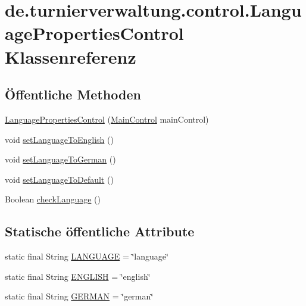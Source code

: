 \hypertarget{classde_1_1turnierverwaltung_1_1control_1_1_language_properties_control}{}\section{de.\+turnierverwaltung.\+control.\+Language\+Properties\+Control Klassenreferenz}
\label{classde_1_1turnierverwaltung_1_1control_1_1_language_properties_control}
\subsection*{Öffentliche Methoden}
\begin{DoxyCompactItemize}
\item 
\hyperlink{classde_1_1turnierverwaltung_1_1control_1_1_language_properties_control_aa565746db91955aac5f76104179d3911}{Language\+Properties\+Control} (\hyperlink{classde_1_1turnierverwaltung_1_1control_1_1_main_control}{Main\+Control} main\+Control)
\item 
void \hyperlink{classde_1_1turnierverwaltung_1_1control_1_1_language_properties_control_a4822b3baef6f0880a496dabd53739182}{set\+Language\+To\+English} ()
\item 
void \hyperlink{classde_1_1turnierverwaltung_1_1control_1_1_language_properties_control_a204477af72a3945c255193041f551e74}{set\+Language\+To\+German} ()
\item 
void \hyperlink{classde_1_1turnierverwaltung_1_1control_1_1_language_properties_control_a9df1cda619d27d4908cce0aed688a7a7}{set\+Language\+To\+Default} ()
\item 
Boolean \hyperlink{classde_1_1turnierverwaltung_1_1control_1_1_language_properties_control_abf3e7a82182d7088324ff935af8b9ada}{check\+Language} ()
\end{DoxyCompactItemize}
\subsection*{Statische öffentliche Attribute}
\begin{DoxyCompactItemize}
\item 
static final String \hyperlink{classde_1_1turnierverwaltung_1_1control_1_1_language_properties_control_a4997322c4c8e0433731c949f0bf45001}{L\+A\+N\+G\+U\+A\+GE} = \char`\"{}language\char`\"{}
\item 
static final String \hyperlink{classde_1_1turnierverwaltung_1_1control_1_1_language_properties_control_ab9e9e73447fb3dd4934902a6b13b1456}{E\+N\+G\+L\+I\+SH} = \char`\"{}english\char`\"{}
\item 
static final String \hyperlink{classde_1_1turnierverwaltung_1_1control_1_1_language_properties_control_ad57a98d828bc9623e457ad5e87438192}{G\+E\+R\+M\+AN} = \char`\"{}german\char`\"{}
\end{DoxyCompactItemize}


